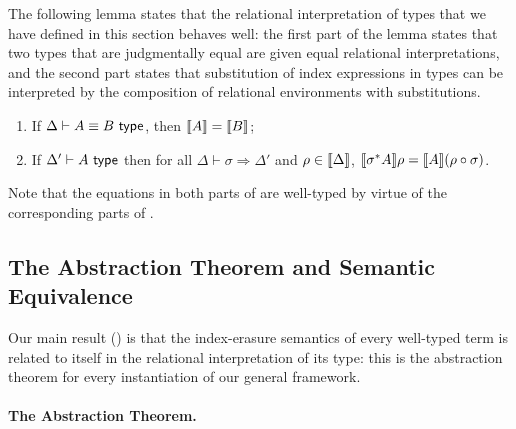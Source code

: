The following lemma states that the relational interpretation of types
that we have defined in this section behaves well: the first part of
the lemma states that two types that are judgmentally equal are given
equal relational interpretations, and the second part states that
substitution of index expressions in types can be interpreted by the
composition of relational environments with 
substitutions.
\begin{lemma}\label{lem:tyeqsubst-relational}
\par
  \begin{enumerate}
  \item If $\Delta \vdash A \equiv B \textup{\textsf{ type}}$, then $\llbracket A \rrbracket =  \llbracket B \rrbracket$;
  \item If $\Delta' \vdash A \textup{\textsf{ type}}$ then for all $\Delta \vdash \sigma \Rightarrow
    \Delta'$ and $\rho \in \llbracket \Delta \rrbracket$,
    $\llbracket \sigma^*A \rrbracket \rho = \llbracket A \rrbracket(\rho \circ \sigma)$.
  \end{enumerate}
\end{lemma}
\noindent
Note that the equations in both parts of
 are well-typed by virtue of the
corresponding parts of .



\subsection{The Abstraction Theorem and Semantic Equivalence}
\label{sec:abstraction-theorem}

Our main result
() is that the index-erasure semantics of
every well-typed term is related to itself in the relational
interpretation of its type: this is the abstraction theorem for every
instantiation of our general framework.

\paragraph{The Abstraction Theorem.}

